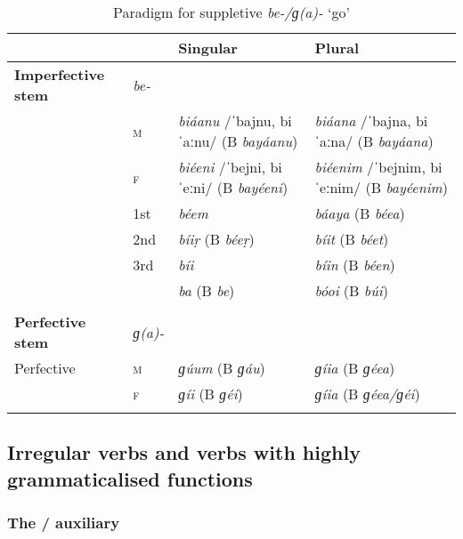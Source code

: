 \begin{table}[t]
\caption{Paradigm for suppletive \textit{be-/ɡ(a)-} `go'}

\begin{tabularx}{\textwidth}{ l@{\hspace{20pt}} l@{\hspace{20pt}} Q Q }
\lsptoprule
&
&
Singular &
Plural\\\midrule
\textbf{Imperfective stem} &
\textit{be-} &
&
\\
 &
\textsc{m} &
\textit{biáanu} /ˈbajnu, biˈaːnu/\newline
(B \textit{bayáanu}) &
\textit{biáana} /ˈbajna, biˈaːna/\newline
(B \textit{bayáana})\\
&
\textsc{f} &
\textit{biéeni} /ˈbejni, biˈeːni/\newline
(B \textit{bayéeni}) &
\textit{biéenim} /ˈbejnim, biˈeːnim/ \newline
(B \textit{bayéenim})\\
 &
1st &
\textit{béem} &
\textit{báaya} (B \textit{béea})\\
&
2nd &
\textit{bíiṛ} (B \textit{béeṛ}) &
\textit{bíit} (B \textit{béet})\\
&
3rd &
\textit{bíi} &
\textit{bíin} (B \textit{béen})\\
 &
&
\textit{ba} (B \textit{be}) &
\textit{bóoi} (B \textit{búi})\\
\\
\textbf{Perfective stem} &
\textit{ɡ(a)-} &
&
\\
Perfective &
\textsc{m} &
\textit{ɡúum} (B \textit{ɡáu}) &
\textit{ɡíia} (B \textit{ɡéea})\\
&
\textsc{f} &
\textit{ɡíi} (B \textit{ɡéi}) &
\textit{ɡíia} (B \textit{ɡéea/ɡéi})\\\lspbottomrule
\end{tabularx}
\label{tab:8-13}
\end{table}



\subsection{Irregular verbs and verbs with highly grammaticalised functions}
\label{subsec:8-3-12}

\subsubsection*{The / auxiliary}

